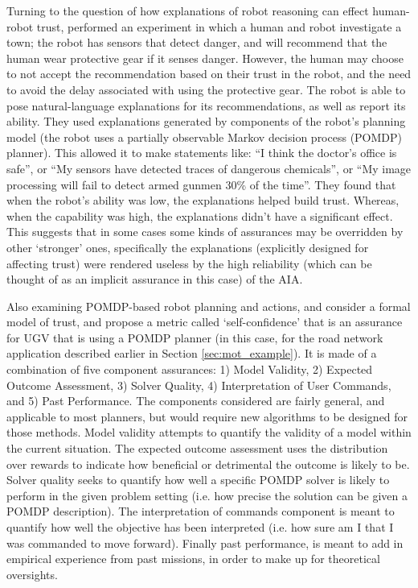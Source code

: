 Turning to the question of how explanations of robot reasoning can effect human-robot trust, \citet{Wang2016-id} performed an experiment in which a human and robot investigate a town; the robot has sensors that detect danger, and will recommend that the human wear protective gear if it senses danger. However, the human may choose to not accept the recommendation based on their trust in the robot, and the need to avoid the delay associated with using the protective gear. The robot is able to pose natural-language explanations for its recommendations, as well as report its ability. They used explanations generated by components of the robot's planning model (the robot uses a partially observable Markov decision process (POMDP) planner). This allowed it to make statements like: ``I think the doctor's office is safe'', or ``My sensors have detected traces of dangerous chemicals'', or ``My image processing will fail to detect armed gunmen 30\% of the time''. They found that when the robot's ability was low, the explanations helped build trust. Whereas, when the capability was high, the explanations didn't have a significant effect. This suggests that in some cases some kinds of assurances may be overridden by other `stronger' ones, specifically the explanations (explicitly designed for affecting trust) were rendered useless by the high reliability (which can be thought of as an implicit assurance in this case) of the AIA.

Also examining POMDP-based robot planning and actions, \citet{Aitken2016-fb} and \citet{Aitken2016-cv} consider a formal model of trust, and propose a metric called `self-confidence' that is an assurance for UGV that is using a  POMDP planner (in this case, for the road network application described earlier in Section \ref{sec:mot_example}). It is made of a combination of five component assurances: 1) Model Validity, 2) Expected Outcome Assessment, 3) Solver Quality, 4) Interpretation of User Commands, and 5) Past Performance. The components considered are fairly general, and applicable to most planners, but would require new algorithms to be designed for those methods. Model validity attempts to quantify the validity of a model within the current situation. The expected outcome assessment uses the distribution over rewards to indicate how beneficial or detrimental the outcome is likely to be. Solver quality seeks to quantify how well a specific POMDP solver is likely to perform in the given problem setting (i.e. how precise the solution can be given a POMDP description). The interpretation of commands component is meant to quantify how well the objective has been interpreted (i.e. how sure am I that I was commanded to move forward). Finally past performance, is meant to add in empirical experience from past missions, in order to make up for theoretical oversights.

